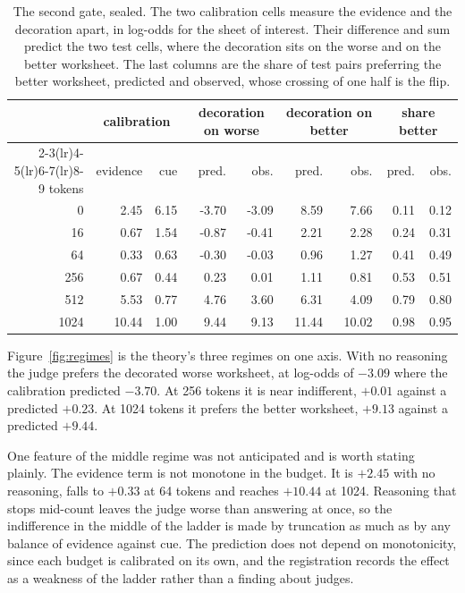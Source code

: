 \documentclass{article}
\theoremstyle{definition}
\theoremstyle{remark}
\begin{document}
\begin{table}[t]
\centering
\small
\caption{The second gate, sealed. The two calibration cells measure the evidence and the decoration apart, in log-odds for the sheet of interest. Their difference and sum predict the two test cells, where the decoration sits on the worse and on the better worksheet. The last columns are the share of test pairs preferring the better worksheet, predicted and observed, whose crossing of one half is the flip.}
\label{tab:flip}
\begin{tabular}{rrrrrrrrr}
\toprule
 & \multicolumn{2}{c}{calibration} & \multicolumn{2}{c}{decoration on worse} & \multicolumn{2}{c}{decoration on better} & \multicolumn{2}{c}{share better} \\
\cmidrule(lr){2-3}\cmidrule(lr){4-5}\cmidrule(lr){6-7}\cmidrule(lr){8-9}
tokens & evidence & cue & pred. & obs. & pred. & obs. & pred. & obs. \\
\midrule
    0 & 2.45 & 6.15 & -3.70 & -3.09 & 8.59 & 7.66 & 0.11 & 0.12 \\
   16 & 0.67 & 1.54 & -0.87 & -0.41 & 2.21 & 2.28 & 0.24 & 0.31 \\
   64 & 0.33 & 0.63 & -0.30 & -0.03 & 0.96 & 1.27 & 0.41 & 0.49 \\
  256 & 0.67 & 0.44 & 0.23 & 0.01 & 1.11 & 0.81 & 0.53 & 0.51 \\
  512 & 5.53 & 0.77 & 4.76 & 3.60 & 6.31 & 4.09 & 0.79 & 0.80 \\
 1024 & 10.44 & 1.00 & 9.44 & 9.13 & 11.44 & 10.02 & 0.98 & 0.95 \\
\bottomrule
\end{tabular}
\end{table}

Figure~\ref{fig:regimes} is the theory's three regimes on one axis.
With no reasoning the judge prefers the decorated worse worksheet, at log-odds of $-3.09$ where the calibration predicted $-3.70$.
At 256 tokens it is near indifferent, $+0.01$ against a predicted $+0.23$.
At 1024 tokens it prefers the better worksheet, $+9.13$ against a predicted $+9.44$.

One feature of the middle regime was not anticipated and is worth stating plainly.
The evidence term is not monotone in the budget. It is $+2.45$ with no reasoning, falls to $+0.33$ at 64 tokens and reaches $+10.44$ at 1024.
Reasoning that stops mid-count leaves the judge worse than answering at once, so the indifference in the middle of the ladder is made by truncation as much as by any balance of evidence against cue.
The prediction does not depend on monotonicity, since each budget is calibrated on its own, and the registration records the effect as a weakness of the ladder rather than a finding about judges.
\end{document}
